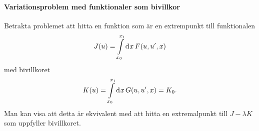 \paragraph{Variationsproblem med funktionaler som bivillkor}
Betrakta problemet att hitta en funktion som är en extrempunkt till funktionalen
\begin{align*}
	J(u) = \int\limits_{x_{0}}^{x_{1}}\dd[]{x}F(u, u', x)
\end{align*}
med bivillkoret
\begin{align*}
	K(u) = \int\limits_{x_{0}}^{x_{1}}\dd[]{x}G(u, u', x) = K_{0}.
\end{align*}
Man kan visa att detta är ekvivalent med att hitta en extremalpunkt till $J - \lambda K$ som uppfyller bivillkoret.